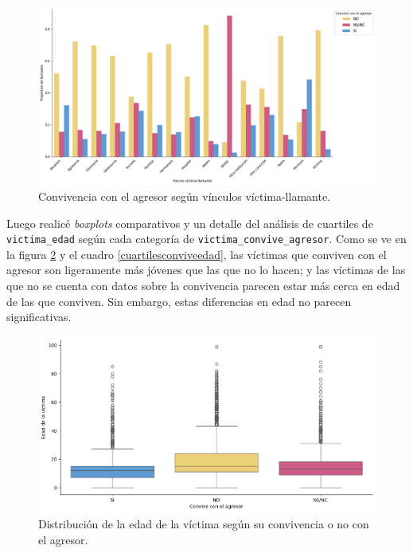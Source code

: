 \documentclass[10 pt]{article}
\begin{document}
\begin{figure}[H]
\begin{center}
\includegraphics[scale=.5]{images/latex_llamante_vin_convive.png}
\caption{Convivencia con el agresor según vínculos víctima-llamante.}
\label{llamvincconvive}
\end{center}
\end{figure} 


Luego realicé \textit{boxplots} comparativos y un detalle del análisis de cuartiles de \texttt{victima\_edad} según cada categoría de \texttt{victima\_convive\_agresor}. Como se ve en la figura \ref{boxplotsconvivenciaedad} y el cuadro \ref{cuartilesconviveedad}, las víctimas que conviven con el agresor son ligeramente más jóvenes que las que no lo hacen; y las víctimas de las que no se cuenta con datos sobre la convivencia parecen estar más cerca en edad de las que conviven. Sin embargo, estas diferencias en edad no parecen significativas.

\begin{figure}[H]
    \begin{center}
    \includegraphics[scale=.5]{images/latex_boxplot_convive_edad.png}
    \caption{Distribución de la edad de la víctima según su convivencia o no con el agresor.}
    \label{boxplotsconvivenciaedad}
    \end{center}
    \end{figure}
\end{document}
